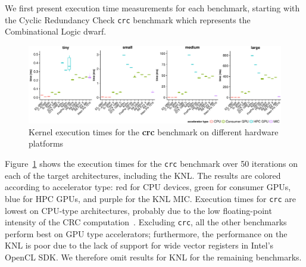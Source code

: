 \documentclass[../document.tex]{subfiles}
\begin{document}
\label{ssec:time}
	
We first present execution time measurements for each benchmark, starting with the Cyclic Redundancy Check {\tt crc} benchmark which represents the Combinational Logic dwarf.

\newcommand{\plotwidth}{0.24\textwidth}

\begin{figure}[t]
	\centering
	\includegraphics[width=\textwidth,keepaspectratio]{figures/new-time-results/generate_crc_row_bandwplot}
	\caption{Kernel execution times for the {\bf crc} benchmark on different hardware platforms}
	\label{fig:time-crc}
\end{figure}


Figure~\ref{fig:time-crc} shows the execution times for the {\tt crc} benchmark over 50 iterations on each of the target architectures, including the KNL.
The results are colored according to accelerator type: red for CPU devices, green for consumer GPUs, blue for HPC GPUs, and purple for the KNL MIC.
Execution times for {\tt crc} are lowest on CPU-type architectures, probably due to the low floating-point intensity of the CRC computation~\cite[Ch. 6]{joshi2016thesis}.
Excluding {\tt crc}, all the other benchmarks perform best on GPU type accelerators; furthermore, the performance on the KNL is poor due to the lack of support for wide vector registers in Intel's OpenCL SDK.
We therefore omit results for KNL for the remaining benchmarks.
\end{document}
